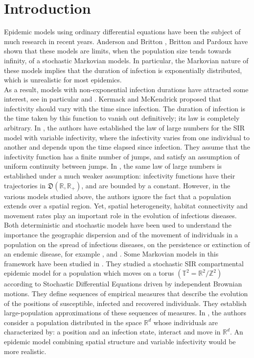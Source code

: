 \documentclass[notitlepage,reqno,11pt]{amsart}
\numberwithin{equation}{section}
\begin{document}
\section{Introduction}
Epidemic models using ordinary differential equations have been the subject of much research in recent years. Anderson and Britton \cite{HA-TB}, Britton and Pardoux \cite{TB-EP} have shown that these models are limits, when the population size tends towards infinity, of a  stochastic Markovian models. In particular, the Markovian nature of these models implies  that the duration of infection is exponentially distributed, which is unrealistic for most epidemics.\\
As a result, models with non-exponential infection durations have attracted some interest, see  in particular \cite{Rienert} and \cite{Wang}. Kermack and McKendrick \cite{WO-AG} proposed that infectivity should vary with the time since infection. The duration of infection is the time taken by this function to vanish out definitively; its law is completely arbitrary. In \cite{FPP}, the authors have established the law of large numbers for the SIR model with variable infectivity, where the infectivity varies from one individual to another and depends upon the time elapsed since infection. They assume that the infectivity function has a finite number of jumps, and satisfy an assumption of uniform continuity between jumps. In \cite{RF-GP-EP}, the same law of large numbers is established under a much weaker assumption: infectivity functions have their trajectories in $\mathfrak{D}(\mathbb{R},\mathbb{R}_+)$, and are bounded by a constant. However, in the various models studied above, the authors ignore the fact that a population extends over a spatial region. Yet, spatial heterogeneity, habitat connectivity and movement rates play an important role in the evolution of infectious diseases. Both deterministic and stochastic models have been used to understand the importance the geographic dispersion and of the movement of individuals in a population on the spread of infectious diseases, on the persistence or extinction of an endemic disease, for example \cite{LJ-BM}, \cite{Kaj} and \cite{MN-EP-TY}. Some Markovian models in this framework have been studied in \cite{SB-AE-EP}. They studied a stochastic SIR compartmental epidemic model for a population which moves on a torus $(\mathbb{T}^2 = \mathbb{R}^2/\mathbb{Z}^2)$ according to Stochastic Differential Equations driven by independent Brownian motions. They define sequences of empirical measures that describe the evolution of the positions of susceptible, infected and recovered individuals.  They establish large-population approximations of these sequences of  measures. In \cite{YV-MH-EP}, the authors consider a population distributed in the space $\mathbb{R}^d$ whose individuals are characterized by: a position and an infection state, interact and move in $\mathbb{R}^d.$ An epidemic model combining spatial structure and variable infectivity would be more realistic. \\
\end{document}

